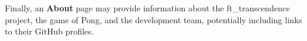 \begin{figure}[H]
\end{figure}

Finally, an \textbf{About} page may provide information about the ft\_transcendence project, the game of Pong, and the development team, potentially including links to their GitHub profiles.

\begin{figure}[H]
\end{figure}
